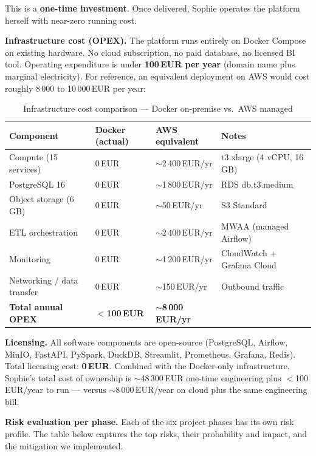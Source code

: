 \documentclass[a4paper,11pt,oneside,openany]{report}
\begin{document}
This is a \textbf{one-time investment}. Once delivered, Sophie
operates the platform herself with near-zero running cost.

\textbf{Infrastructure cost (OPEX).} The platform runs entirely on
Docker Compose on existing hardware. No cloud subscription, no paid
database, no licensed BI tool. Operating expenditure is under
\textbf{100\,EUR per year} (domain name plus marginal electricity).
For reference, an equivalent deployment on AWS would cost roughly
8\,000 to 10\,000\,EUR per year:

\begin{table}[H]
\centering
\caption{Infrastructure cost comparison --- Docker on-premise vs.\ AWS managed}
\label{tab:capex}
\begin{tabularx}{\textwidth}{L{4cm} C{2.5cm} C{2.5cm} L{3.5cm}}
\toprule
\textbf{Component} & \textbf{Docker (actual)} & \textbf{AWS equivalent} & \textbf{Notes} \\
\midrule
Compute (15 services) & 0\,EUR & $\sim$2\,400\,EUR/yr & t3.xlarge (4 vCPU, 16\,GB) \\
PostgreSQL 16 & 0\,EUR & $\sim$1\,800\,EUR/yr & RDS db.t3.medium \\
Object storage (6\,GB) & 0\,EUR & $\sim$50\,EUR/yr & S3 Standard \\
ETL orchestration & 0\,EUR & $\sim$2\,400\,EUR/yr & MWAA (managed Airflow) \\
Monitoring & 0\,EUR & $\sim$1\,200\,EUR/yr & CloudWatch + Grafana Cloud \\
Networking / data transfer & 0\,EUR & $\sim$150\,EUR/yr & Outbound traffic \\
\midrule
\textbf{Total annual OPEX} & \textbf{$<$100\,EUR} & \textbf{$\sim$8\,000\,EUR/yr} & \\
\bottomrule
\end{tabularx}
\end{table}

\textbf{Licensing.} All software components are open-source
(PostgreSQL, Airflow, MinIO, FastAPI, PySpark, DuckDB, Streamlit,
Prometheus, Grafana, Redis). Total licensing cost:
\textbf{0\,EUR}. Combined with the Docker-only infrastructure,
Sophie's total cost of ownership is $\sim$48\,300\,EUR one-time
engineering plus $<$100\,EUR/year to run --- versus $\sim$8\,000\,EUR/year
on cloud plus the same engineering bill.

\textbf{Risk evaluation per phase.} Each of the six project phases
has its own risk profile. The table below captures the top risks,
their probability and impact, and the mitigation we implemented.
\end{document}
